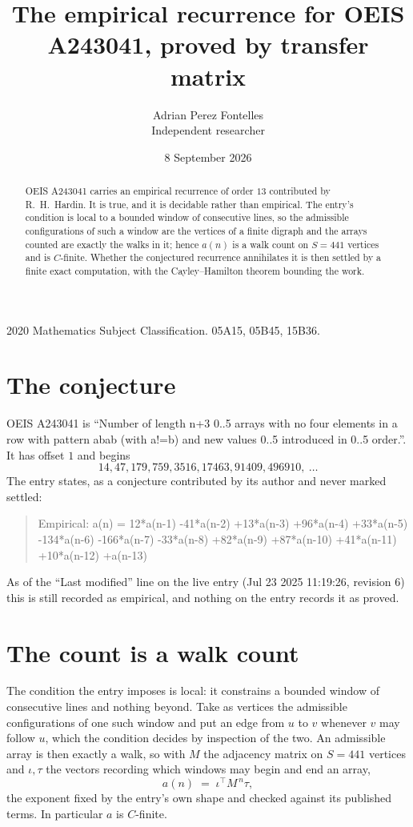\documentclass[11pt,a4paper]{article}
\title{The empirical recurrence for OEIS A243041, proved by transfer matrix}
\author{Adrian Perez Fontelles\\ \small Independent researcher}
\date{8 September 2026}
\theoremstyle{plain}
\theoremstyle{definition}
\begin{document}
\maketitle

\begin{abstract}
OEIS A243041 carries an empirical recurrence of order $13$ contributed by R.~H.~Hardin. It is
true, and it is decidable rather than empirical. The entry's condition is local to a bounded window of consecutive lines, so
the admissible configurations of such a window are the vertices of a finite digraph and the
arrays counted are exactly the walks in it; hence $a(n)$ is a walk count on $S=441$ vertices
and is $C$-finite. Whether the conjectured recurrence annihilates it is then settled by a
finite exact computation, with the Cayley--Hamilton theorem bounding the work.
\end{abstract}

\noindent\small 2020 Mathematics Subject Classification. 05A15, 05B45, 15B36.\normalsize

\section{The conjecture}

OEIS A243041 is ``Number of length n+3 0..5 arrays with no four elements in a row with pattern abab (with a!=b) and new values 0..5 introduced in 0..5 order.''. It has offset $1$ and begins
\[
14, 47, 179, 759, 3516, 17463, 91409, 496910,\ \dots
\]
The entry states, as a conjecture contributed by its author and never marked settled:
\begin{quote}
Empirical: a(n) = 12*a(n-1) -41*a(n-2) +13*a(n-3) +96*a(n-4) +33*a(n-5) -134*a(n-6) -166*a(n-7) -33*a(n-8) +82*a(n-9) +87*a(n-10) +41*a(n-11) +10*a(n-12) +a(n-13)
\end{quote}
As of the ``Last modified'' line on the live entry (Jul 23 2025 11:19:26, revision 6) this is still
recorded as empirical, and nothing on the entry records it as proved.

\section{The count is a walk count}

The condition the entry imposes is local: it constrains a bounded window of consecutive lines and nothing beyond. Take as
vertices the admissible configurations of one such window and put an edge from $u$ to $v$
whenever $v$ may follow $u$, which the condition decides by inspection of the two. An
admissible array is then exactly a walk, so with $M$ the adjacency matrix on $S=441$ vertices
and $\iota,\tau$ the vectors recording which windows may begin and end an array,
\[
a(n)\;=\;\iota^{\!\top}M^{\,n}\tau ,
\]
the exponent fixed by the entry's own shape and checked against its published terms. In
particular $a$ is $C$-finite.
\end{document}
